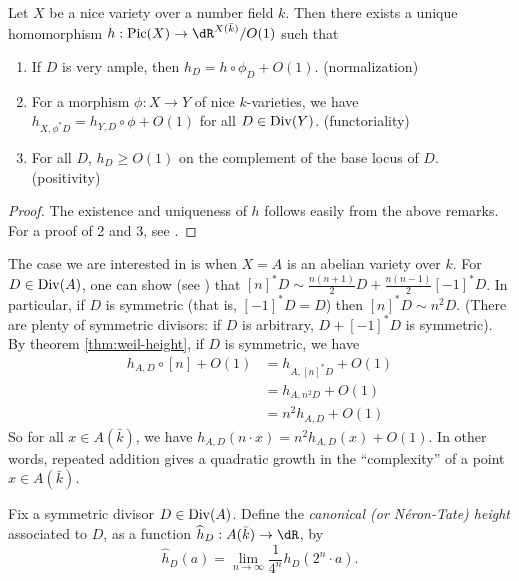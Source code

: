 \documentclass{article}
\begin{document}
\begin{theorem}\label{thm:weil-height}
Let $X$ be a nice variety over a number field $k$. Then there exists a unique 
homomorphism $h:\picard(X)\to \dR^{X(\bar k)}/O(1)$ such that 
\begin{enumerate}
  \item If $D$ is very ample, then $h_D=h\circ \phi_D+O(1)$. (normalization)
  \item For a morphism $\phi:X\to Y$ of nice $k$-varieties, we have 
    $h_{X,\phi^\ast D} = h_{Y,D}\circ\phi + O(1)$ for all $D\in \operatorname{Div}(Y)$. 
    (functoriality)
  \item For all $D$, $h_D\geqslant O(1)$ on the complement of the base locus 
    of $D$. (positivity)
\end{enumerate}
\end{theorem}
\begin{proof}
The existence and uniqueness of $h$ follows easily from the above remarks. For 
a proof of 2 and 3, see \cite[\S2.4]{bg06}. 
\end{proof}

The case we are interested in is when $X=A$ is an abelian variety over $k$. For 
$D\in \operatorname{Div}(A)$, one can show (see \cite[I.5.4]{mi}) that 
$[n]^\ast D\sim \frac{n(n+1)}{2} D + \frac{n(n-1)}{2}[-1]^\ast D$. In 
particular, if $D$ is symmetric (that is, $[-1]^\ast D=D$) then 
$[n]^\ast D\sim n^2 D$. (There are plenty of symmetric divisors: if $D$ is 
arbitrary, $D+[-1]^\ast D$ is symmetric). By theorem \ref{thm:weil-height}, 
if $D$ is symmetric, we have 
\begin{align*}
  h_{A,D}\circ[n]+O(1)
    &= h_{A,[n]^\ast D} + O(1) \\
    &= h_{A,n^2 D}+O(1) \\
    &= n^2 h_{A,D}+O(1)
\end{align*}
So for all $x\in A(\bar k)$, we have 
$h_{A,D}(n\cdot x) = n^2 h_{A,D}(x)+O(1)$. In other words, repeated addition 
gives a quadratic growth in the ``complexity'' of a point $x\in A(\bar k)$. 

Fix a symmetric divisor $D\in \operatorname{Div}(A)$. Define the \emph{canonical (or 
N\'eron-Tate) height} associated to $D$, as a function 
$\widehat h_D:A(\bar k)\to \dR$, by 
\[
  \widehat h_D(a) = \lim_{n\to \infty} \frac{1}{4^n} h_D(2^n\cdot a) \text{.}
\]
\end{document}
